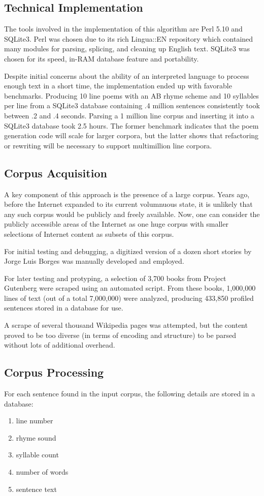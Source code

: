 \documentclass[10pt]{article}
\begin{document}
\subsection{Technical Implementation}
The tools involved in the implementation of this algorithm are Perl 5.10 and
SQLite3. Perl was chosen due to its rich Lingua::EN repository which contained
many modules for parsing, splicing, and cleaning up English text. SQLite3 was
chosen for its speed, in-RAM database feature and portability.

Despite initial concerns about the ability of an interpreted language to
process enough text in a short time, the implementation ended up with favorable
benchmarks. Producing 10 line poems with an AB rhyme scheme and 10 syllables
per line from a SQLite3 database containing .4 million sentences consistently
took between .2 and .4 seconds. Parsing a 1 million line corpus and inserting
it into a SQLite3 database took 2.5 hours.  The former benchmark indicates that
the poem generation code will scale for larger corpora, but the latter shows
that refactoring or rewriting will be necessary to support multimillion line
corpora.

\subsection{Corpus Acquisition}
A key component of this approach is the presence of a large corpus. Years ago,
before the Internet expanded to its current volumnuous state, it is unlikely
that any such corpus would be publicly and freely available. Now, one can
consider the publicly accessible areas of the Internet as one huge corpus with
smaller selections of Internet content as subsets of this corpus.

For initial testing and debugging, a digitized version of a dozen short stories
by Jorge Luis Borges was manually developed and employed.

For later testing and protyping, a selection of 3,700 books from Project
Gutenberg were scraped using an automated script. From these books, 1,000,000
lines of text (out of a total 7,000,000) were analyzed, producing 433,850
profiled sentences stored in a database for use.

A scrape of several thousand Wikipedia pages was attempted, but the content
proved to be too diverse (in terms of encoding and structure) to be parsed
without lots of additional overhead.

\subsection{Corpus Processing}
For each sentence found in the input corpus, the following details are stored in a database:
\onehalfspacing
\begin{enumerate}
\item line number
\item rhyme sound
\item syllable count
\item number of words
\item sentence text
\end{enumerate}
\doublespacing
\end{document}

